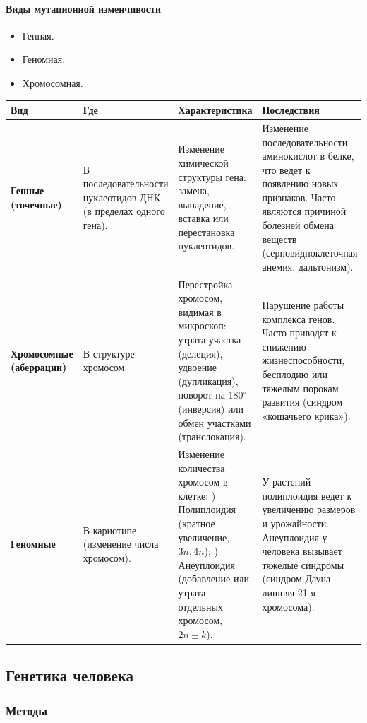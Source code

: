 \documentclass[12pt]{article}
\begin{document}
	\paragraph{Виды мутационной изменчивости}
	
	\begin{itemize}
		\item Генная.
		\item Геномная.
		\item Хромосомная.
	\end{itemize}
	
	\begin{xltabular}{\textwidth}{|X|X|X|X|}
		\hline
		\textbf{Вид} & \textbf{Где} & \textbf{Характеристика} & \textbf{Последствия}\\
		\hline
		\textbf{Генные (точечные)} & В последовательности нуклеотидов ДНК (в пределах одного гена). & Изменение химической структуры гена: замена, выпадение, вставка или перестановка нуклеотидов. & Изменение последовательности аминокислот в белке, что ведет к появлению новых признаков. Часто являются причиной болезней обмена веществ (серповидноклеточная анемия, дальтонизм).\\
		\hline
		\textbf{Хромосомные (аберрации)} & В структуре хромосом. & Перестройка хромосом, видимая в микроскоп: утрата участка (делеция), удвоение (дупликация), поворот на $180^\circ$ (инверсия) или обмен участками (транслокация). & Нарушение работы комплекса генов. Часто приводят к снижению жизнеспособности, бесплодию или тяжелым порокам развития (синдром «кошачьего крика»).\\
		\hline
		\textbf{Геномные} & В кариотипе (изменение числа хромосом). & Изменение количества хромосом в клетке: ) Полиплоидия (кратное увеличение, $3n, 4n$); ) Анеуплоидия (добавление или утрата отдельных хромосом, $2n \pm k$). & У растений полиплоидия ведет к увеличению размеров и урожайности. Анеуплоидия у человека вызывает тяжелые синдромы (синдром Дауна — лишняя 21-я хромосома).\\
		\hline
	\end{xltabular}
	
	\subsection{Генетика человека}
	
	\subsubsection{Методы}
	
\end{document}
